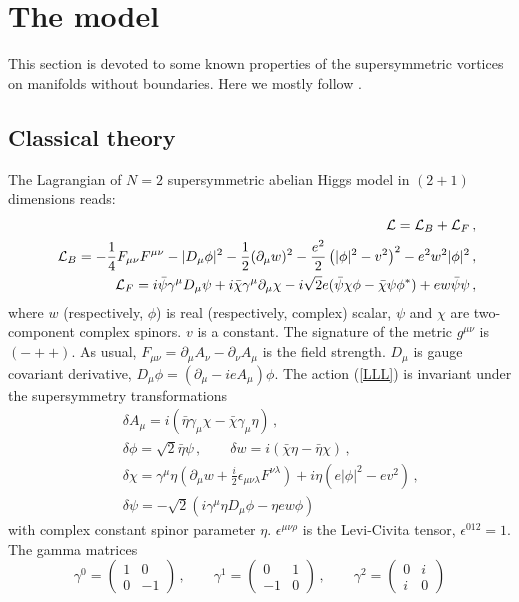 \documentclass[a4paper,12pt]{article}
\begin{document}
\section{The model}
This section is devoted to some known properties of the supersymmetric vortices
on manifolds without boundaries. Here we mostly follow 
\cite{Lee:yc,Lee:1994pm}.
\subsection{Classical theory}
The Lagrangian of $N=2$
supersymmetric abelian Higgs model in $(2+1)$ dimensions reads:
\begin{eqnarray} 
&&{\cal L}={\cal L}_B+{\cal L}_F \,,\label{LLL}\\
&&{\cal L}_B=-\frac 14 F_{\mu\nu}F^{\mu\nu} -|D_\mu \phi |^2
             -\frac 12 (\partial_\mu w )^2 
             -\frac{e^2}2 \left( |\phi|^2 -v^2 \right)^2
             -e^2 w^2 |\phi|^2 \,,\label{LB} \\
&&{\cal L}_F=i\bar\psi \gamma^\mu D_\mu \psi 
             +i\bar\chi \gamma^\mu \partial_\mu \chi
             -i \sqrt{2} e (\bar\psi \chi \phi -\bar\chi\psi \phi^*)
             +ew\bar\psi\psi \,,\label{LF}
\end{eqnarray}
where $w$  (respectively, $\phi$) is real (respectively, complex) scalar, 
$\psi$ and $\chi$
are two-component complex spinors. $v$ is a constant. 
The signature of the metric $g^{\mu\nu}$ is $(-++)$. As usual, 
$F_{\mu\nu}=\partial_\mu A_\nu -\partial_\nu A_\mu$ is the field strength.
$D_\mu$ is gauge covariant derivative, 
$D_\mu \phi =(\partial_\mu -ieA_\mu )\phi$. The action (\ref{LLL}) is invariant
under the supersymmetry transformations
\begin{eqnarray}
&&\delta A_\mu =i\left( \bar\eta \gamma_\mu \chi -
\bar\chi\gamma_\mu \eta \right) \,,\nonumber \\
&&\delta \phi = \sqrt{2} \bar\eta \psi\,,\qquad
\delta w =i (\bar\chi \eta -\bar \eta \chi ) \,,\nonumber \\
&&\delta \chi = \gamma^\mu \eta \left( \partial_\mu w +
\frac i2 \epsilon_{\mu\nu\lambda}F^{\nu\lambda} \right)
+i\eta (e |\phi |^2 -ev^2 ) \,,\nonumber \\
&&\delta \psi =-\sqrt{2} \left( i\gamma^\mu \eta D_\mu \phi
-\eta e w \phi \right) \label{susy}
\end{eqnarray}
with complex constant spinor parameter $\eta$. $\epsilon^{\mu\nu\rho}$
is the Levi-Civita tensor, $\epsilon^{012}=1$.
The gamma matrices
\begin{equation}
\gamma^0=\left( \begin{array}{cc}
1&0\\
0&-1 \end{array}\right)\,,\qquad
\gamma^1=\left( \begin{array}{cc}
0&1\\
-1&0 \end{array}\right)\,,\qquad
\gamma^2=\left( \begin{array}{cc}
0&i\\
i&0 \end{array}\right) \label{gamma}
\end{equation}
\end{document}
